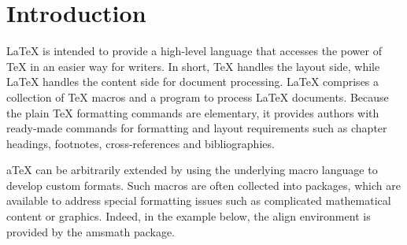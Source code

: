 \section{Introduction}
\label{sec:intro}

LaTeX is intended to provide a high-level language that accesses the power of TeX in an easier way for writers. In short, TeX handles the layout side, while LaTeX handles the content side for document processing. LaTeX comprises a collection of TeX macros and a program to process LaTeX documents. Because the plain TeX formatting commands are elementary, it provides authors with ready-made commands for formatting and layout requirements such as chapter headings, footnotes, cross-references and bibliographies.

aTeX can be arbitrarily extended by using the underlying macro language to develop custom formats. Such macros are often collected into packages, which are available to address special formatting issues such as complicated mathematical content or graphics. Indeed, in the example below, the align environment is provided by the amsmath package.




